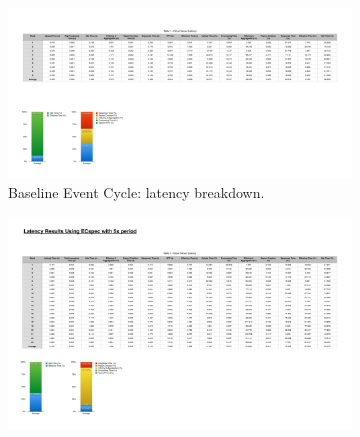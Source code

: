 \begin{figure}[ht!]
  \centering
  \begin{subfigure}{.5\textwidth}
    \centering
    \includegraphics[height=\linewidth]{./images/cloud_ecspec_breakdown}
    \caption{Baseline Event Cycle: latency breakdown.}
    \label{fig:ecspecf_base}
  \end{subfigure}%
  \begin{subfigure}{.5\textwidth}
    \centering
    \includegraphics[height=\linewidth]{./images/cloud_ecspecf_breakdown}

\end{subfigure}
\end{figure}

